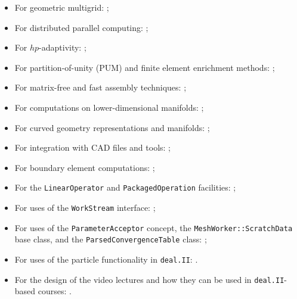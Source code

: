 \documentclass{ansarticle-preprint}
\newcommand{\specialword}[1]{\texttt{#1}}
\newcommand{\dealii}{{\specialword{deal.II}}\xspace}
\begin{document}
\begin{multicols}{2}
  \vspace*{-36pt}
  \begin{itemize}[leftmargin=4mm]
    \item For geometric multigrid: \cite{Kanschat2004,JanssenKanschat2011,ClevengerHeisterKanschatKronbichler2019, munch2022gc};
    \item For distributed parallel computing: \cite{BangerthBursteddeHeisterKronbichler11};
    \item For $hp$-adaptivity: \cite{BangerthKayserHerold2007,fehlingbangerth2023};
    \item For partition-of-unity (PUM) and finite element enrichment methods:
           \cite{Davydov2016};
    \item For matrix-free and fast assembly techniques:
          \cite{KronbichlerKormann2012,KronbichlerKormann2019};
    \item For computations on lower-dimensional manifolds:
          \cite{DeSimoneHeltaiManigrasso2009};
    \item For curved geometry representations and manifolds:
          \cite{HeltaiBangerthKronbichlerMola2019};
    \item For integration with CAD files and tools:
          \cite{HeltaiMola2015};
    \item For boundary element computations:
          \cite{GiulianiMolaHeltai-2018-a};
    \item For the \texttt{LinearOperator} and
      \texttt{Packaged\-Operation} facilities:
          \cite{MaierBardelloniHeltai-2016-a,MaierBardelloniHeltai-2016-b};
    \item For uses of the \texttt{WorkStream} interface:
          \cite{TKB16};
    \item For uses of the \texttt{ParameterAcceptor} concept, the
          \texttt{MeshWorker::ScratchData} base class, and the
          \texttt{ParsedConvergenceTable} class:
          \cite{SartoriGiulianiBardelloni-2018-a};
    \item For uses of the particle functionality in \dealii:
      \cite{GLHPB18}.
      \item For the design of the video lectures and how they can be
        used in \dealii{}-based courses: \cite{Zarestky2022}.
          \vfill\null
  \end{itemize}
\end{multicols}
\end{document}
